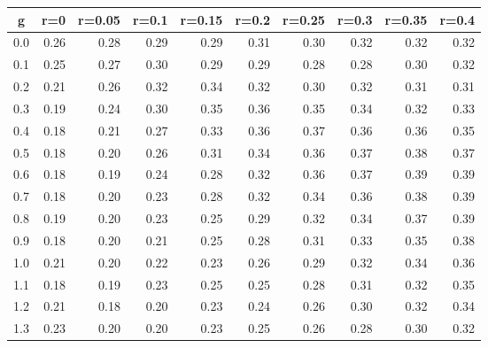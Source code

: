 %
\begin{table}[!tbp]
 \begin{center}
 \begin{tabular}{rrrrrrrrrr}\hline\hline
\multicolumn{1}{c}{g}&\multicolumn{1}{c}{r=0}&\multicolumn{1}{c}{r=0.05}&\multicolumn{1}{c}{r=0.1}&\multicolumn{1}{c}{r=0.15}&\multicolumn{1}{c}{r=0.2}&\multicolumn{1}{c}{r=0.25}&\multicolumn{1}{c}{r=0.3}&\multicolumn{1}{c}{r=0.35}&\multicolumn{1}{c}{r=0.4}\tabularnewline
\hline
0.0&0.26&0.28&0.29&0.29&0.31&0.30&0.32&0.32&0.32\tabularnewline
0.1&0.25&0.27&0.30&0.29&0.29&0.28&0.28&0.30&0.32\tabularnewline
0.2&0.21&0.26&0.32&0.34&0.32&0.30&0.32&0.31&0.31\tabularnewline
0.3&0.19&0.24&0.30&0.35&0.36&0.35&0.34&0.32&0.33\tabularnewline
0.4&0.18&0.21&0.27&0.33&0.36&0.37&0.36&0.36&0.35\tabularnewline
0.5&0.18&0.20&0.26&0.31&0.34&0.36&0.37&0.38&0.37\tabularnewline
0.6&0.18&0.19&0.24&0.28&0.32&0.36&0.37&0.39&0.39\tabularnewline
0.7&0.18&0.20&0.23&0.28&0.32&0.34&0.36&0.38&0.39\tabularnewline
0.8&0.19&0.20&0.23&0.25&0.29&0.32&0.34&0.37&0.39\tabularnewline
0.9&0.18&0.20&0.21&0.25&0.28&0.31&0.33&0.35&0.38\tabularnewline
1.0&0.21&0.20&0.22&0.23&0.26&0.29&0.32&0.34&0.36\tabularnewline
1.1&0.18&0.19&0.23&0.25&0.25&0.28&0.31&0.32&0.35\tabularnewline
1.2&0.21&0.18&0.20&0.23&0.24&0.26&0.30&0.32&0.34\tabularnewline
1.3&0.23&0.20&0.20&0.23&0.25&0.26&0.28&0.30&0.32\tabularnewline
\hline
\end{tabular}

\end{center}

\end{table}

